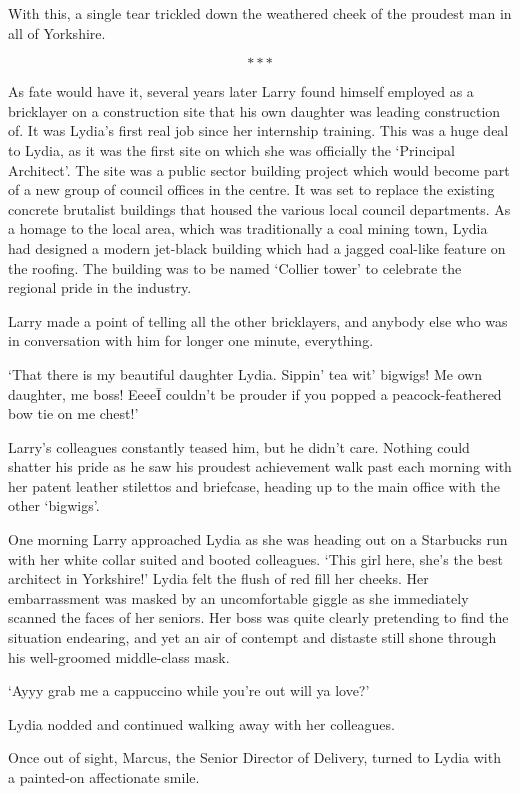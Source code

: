 With this, a single tear trickled down the weathered cheek of the
proudest man in all of Yorkshire.

\[***\]

As fate would have it, several years later Larry found himself
employed as a bricklayer on a construction site that his own daughter
was leading construction of. It was Lydia's first real job since her
internship training.  This was a huge deal to Lydia, as it was the
first site on which she was officially the `Principal Architect'. The
site was a public sector building project which would become part of a
new group of council offices in the centre. It was set to replace the
existing concrete brutalist buildings that housed the various local
council departments. As a homage to the local area, which was
traditionally a coal mining town, Lydia had designed a modern jet-black
building which had a jagged coal-like feature on the roofing. The building
was to be named `Collier tower' to celebrate the regional pride in the industry.

Larry made a point of telling all the other bricklayers, and anybody
else who was in conversation with him for longer one minute,
everything.

`That there is my beautiful daughter Lydia. Sippin' tea wit' bigwigs!
Me own daughter, me boss! Eeee\=I couldn't be prouder if you popped a
peacock-feathered bow tie on me chest!'

Larry's colleagues constantly teased him, but he didn't care. Nothing
could shatter his pride as he saw his proudest achievement walk past
each morning with her patent leather stilettos and briefcase, heading
up to the main office with the other `bigwigs'.

One morning Larry approached Lydia as she was heading out on a
Starbucks run with her white collar suited and booted
colleagues. `This girl here, she's the best architect in Yorkshire!'
Lydia felt the flush of red fill her cheeks. Her embarrassment was
masked by an uncomfortable giggle as she immediately scanned the faces
of her seniors. Her boss was quite clearly pretending to find the
situation endearing, and yet an air of contempt and distaste still
shone through his well-groomed middle-class mask.

`Ayyy grab me a cappuccino while you're out will ya love?'

Lydia nodded and continued walking away with her colleagues.

Once out of sight, Marcus, the Senior Director of Delivery, turned to
Lydia with a painted-on affectionate smile.

